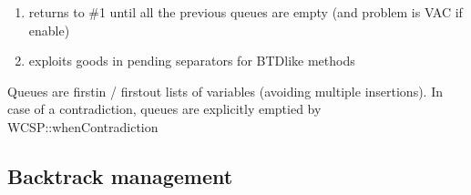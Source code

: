 \documentclass[letterpaper,10pt,openany,oneside,english]{sphinxmanual}
\begin{document}
\begin{fulllineitems}
\begin{enumerate}
\item {} 
\sphinxAtStartPar
returns to \#1 until all the previous queues are empty (and problem is VAC if enable)

\item {} 
\sphinxAtStartPar
exploits goods in pending separators for BTD\sphinxhyphen{}like methods

\end{enumerate}


\sphinxAtStartPar
Queues are first\sphinxhyphen{}in / first\sphinxhyphen{}out lists of variables (avoiding multiple insertions). In case of a contradiction, queues are explicitly emptied by WCSP::whenContradiction 

\end{fulllineitems}



\subsection{Backtrack management}
\label{\detokenize{ref/ref_modules:backtrack-management}}
\end{document}
